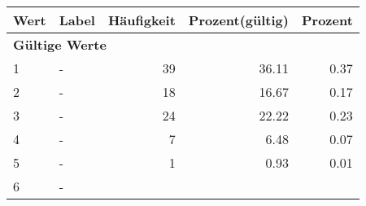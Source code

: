      \begin{longtable}{lXrrr}
     \toprule
     \textbf{Wert} & \textbf{Label} & \textbf{Häufigkeit} & \textbf{Prozent(gültig)} & \textbf{Prozent} \\
     \endhead
     \midrule
     \multicolumn{5}{l}{\textbf{Gültige Werte}}\\

     1 &
     \multicolumn{1}{X}{ -  } &


       \num{39} &
       \num[round-mode=places,round-precision=2]{36.11} &
         \num[round-mode=places,round-precision=2]{0.37} \\

     2 &
     \multicolumn{1}{X}{ -  } &


       \num{18} &
       \num[round-mode=places,round-precision=2]{16.67} &
         \num[round-mode=places,round-precision=2]{0.17} \\

     3 &
     \multicolumn{1}{X}{ -  } &


       \num{24} &
       \num[round-mode=places,round-precision=2]{22.22} &
         \num[round-mode=places,round-precision=2]{0.23} \\

     4 &
     \multicolumn{1}{X}{ -  } &


       \num{7} &
       \num[round-mode=places,round-precision=2]{6.48} &
         \num[round-mode=places,round-precision=2]{0.07} \\

     5 &
     \multicolumn{1}{X}{ -  } &


       \num{1} &
       \num[round-mode=places,round-precision=2]{0.93} &
         \num[round-mode=places,round-precision=2]{0.01} \\

     6 &
     \multicolumn{1}{X}{ -  } &



\end{longtable}
